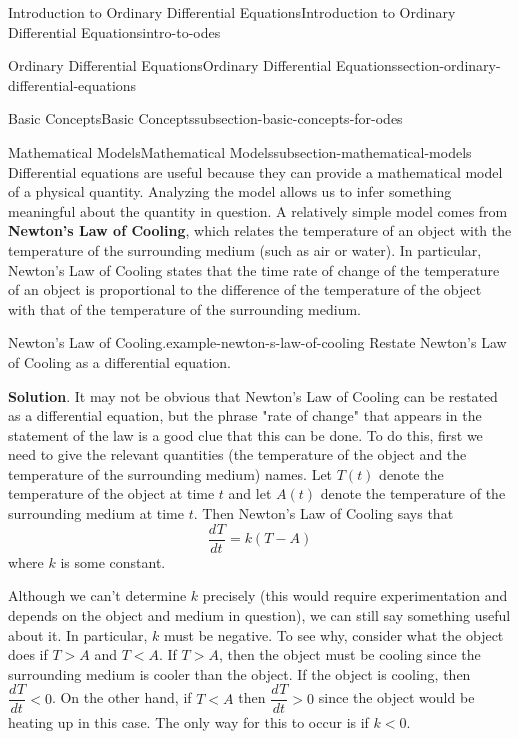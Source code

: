 \documentclass[oneside,10pt,]{book}
\newcommand{\terminology}[1]{\textbf{#1}}
\numberwithin{equation}{section}
\newcommand{\dv}[3][]{\dfrac{d^{#1} #2}{d #3^{#1}}}
\newcommand{\lt}{<}
\newcommand{\gt}{>}
\begin{document}
\begin{chapterptx}{Introduction to Ordinary Differential Equations}{}{Introduction to Ordinary Differential Equations}{}{}{intro-to-odes}
\begin{sectionptx}{Ordinary Differential Equations}{}{Ordinary Differential Equations}{}{}{section-ordinary-differential-equations}
\begin{subsectionptx}{Basic Concepts}{}{Basic Concepts}{}{}{subsection-basic-concepts-for-odes}
\begin{enumerate}
\end{enumerate}
%
\end{subsectionptx}
%
%
\typeout{************************************************}
\typeout{************************************************}
%
\begin{subsectionptx}{Mathematical Models}{}{Mathematical Models}{}{}{subsection-mathematical-models}
\hypertarget{p-26}{}%
Differential equations are useful because they can provide a mathematical model of a physical quantity. Analyzing the model allows us to infer something meaningful about the quantity in question. A relatively simple model comes from \terminology{Newton's Law of Cooling}, which relates the temperature of an object with the temperature of the surrounding medium (such as air or water). In particular, Newton's Law of Cooling states that the time rate of change of the temperature of an object is proportional to the difference of the temperature of the object with that of the temperature of the surrounding medium.%
\begin{example}{Newton's Law of Cooling.}{example-newton-s-law-of-cooling}%
\hypertarget{p-27}{}%
Restate Newton's Law of Cooling as a differential equation.%
\par\smallskip%
\noindent\textbf{Solution}.\hypertarget{solution-4}{}\quad%
\hypertarget{p-28}{}%
It may not be obvious that Newton's Law of Cooling can be restated as a differential equation, but the phrase "rate of change" that appears in the statement of the law is a good clue that this can be done. To do this, first we need to give the relevant quantities (the temperature of the object and the temperature of the surrounding medium) names. Let \(T(t)\) denote the temperature of the object at time \(t\) and let \(A(t)\) denote the temperature of the surrounding medium at time \(t\). Then Newton's Law of Cooling says that%
\begin{equation*}
\dv{T}{t} = k(T-A)
\end{equation*}
where \(k\) is some constant.%
\par
\hypertarget{p-29}{}%
Although we can't determine \(k\) precisely (this would require experimentation and depends on the object and medium in question), we can still say something useful about it. In particular, \(k\) must be negative. To see why, consider what the object does if \(T\gt A\) and \(T\lt A\). If \(T\gt A\), then the object must be cooling since the surrounding medium is cooler than the object. If the object is cooling, then \(\dv{T}{t}\lt0\). On the other hand, if \(T\lt A\) then \(\dv{T}{t}\gt0\) since the object would be heating up in this case. The only way for this to occur is if \(k\lt0\).%

\end{example}
\end{subsectionptx}
\end{sectionptx}
\end{chapterptx}
\end{document}
